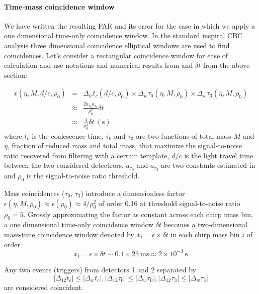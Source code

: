\documentclass[epsf]{article}
\begin{document}
\paragraph{Time-mass coincidence window}
We have written the resulting FAR and its error for the case in which we apply a one dimensional time-only coincidence window. In the standard inspiral CBC analysis three dimensional coincidence elliptical windows are used to find coincidences. Let's consider a rectangular coincidence window for ease of calculation and use notations and numerical results from \cite{japan} and $\delta t$ from the above section:

\begin{eqnarray}
x(\eta, M, d/c, \rho_0) &=& \Delta_w t_c(d/c, \rho_0) \times \Delta_w \tau_0(\eta, M, \rho_0) \times \Delta_w \tau_3(\eta, M, \rho_0) \nonumber\\
                        &\approx& \frac{2a_{\tau_0}a_{\tau_3}}{\rho^2_0} \delta t \nonumber\\
                        &\approx& \frac{4}{\rho^2_0} \delta t ~\mathrm{(s)} 
\end{eqnarray}
%
where $t_c$ is the coalescence time, $\tau_0$ and $\tau_3$ are two functions of total mass $M$ and $\eta$, fraction of reduced mass and total mass, that maximize the signal-to-noise ratio recovered from filtering with a certain template, $d/c$ is the light travel time between the two considered detectrors, $a_{\tau_0}$ and $a_{\tau_3}$ are two constants estimated in \cite{japan} and $\rho_0$ is the signal-to-noise ratio threshold. 

Mass coincidences ($\tau_0$, $\tau_3$) introduce a dimensionless factor $\epsilon(\eta, M, \rho_0) \approx \epsilon(\rho_0) \approx 4/\rho_0^2$ of order 0.16 at threshold signal-to-noise ratio $\rho_0=5$. Grossly approximating the factor as constant across each chirp mass bin, a one dimensional time-only coincidence window $\delta t$ becomes a two-dimensional mass-time coincidence window denoted by $x_i = \epsilon \times \delta t$ in each chirp mass bin $i$ of order 
%
\begin{equation}
x_i = \epsilon \times \delta t \sim 0.1 \times 25 ~\mathrm{ms} \approx 2 \times 10^{-3} ~\mathrm{s}
\end{equation}

Any two events (triggers) from detectors 1 and 2 separated by 
%
\begin{equation}
|\Delta_{12} t_c| \leq |\Delta_w t_c|, |\Delta_{12} \tau_0| \leq |\Delta_w \tau_0|, |\Delta_{12} \tau_3| \leq |\Delta_w \tau_3|
\end{equation}
%
are considered coincident. 
\end{document}
